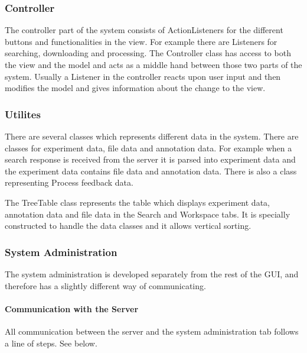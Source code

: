 \subsubsection{Controller}
The controller part of the system consists of ActionListeners for the different buttons and functionalities in the view. For example there are Listeners for searching, downloading and processing. The Controller class has access to both the view and the model and acts as a middle hand between those two parts of the system. Usually a Listener in the controller reacts upon user input and then modifies the model and gives information about the change to the view.


\subsubsection{Utilites}

There are several classes which represents different data in the system. There are classes for experiment data, file data and annotation data. For example when a search response is received from the server it is parsed into experiment data and the experiment data contains file data and annotation data. There is also a class representing Process feedback data.

The TreeTable class represents the table which displays experiment data, annotation data and file data in the Search and Workspace tabs. It is specially constructed to handle the data classes and it allows vertical sorting.

\subsubsection{System Administration}
The system administration is developed separately from the rest of the GUI, and therefore has a slightly different way of communicating.

\paragraph{Communication with the Server}
\label{Communication with the Server}

All communication between the server and the system administration tab follows a line of steps. See  below.

